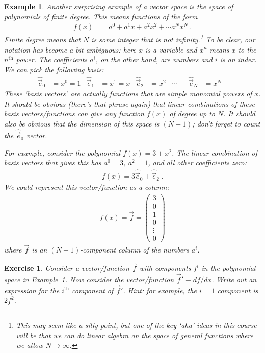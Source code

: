 \documentclass[12pt]{article}
\newtheorem{exercise}{Exercise}[section]
\newtheorem{example}{Example}[section]
\begin{document}
\begin{example}\label{eg:polynomial:space}
Another surprising example of a vector space is the space of polynomials of finite degree. This means functions of the form
\begin{align}
    f(x) &= a^0 + a^1 x + a^2x^2 + \cdots a^N x^N \ .
\end{align}
Finite degree means that $N$ is some integer that is not infinity.\footnote{This may seem like a silly point, but one of the key `aha' ideas in this course will be that we can do linear algebra on the space of general functions where we allow $N\to \infty$.}
To be clear, our notation has become a bit ambiguous: here $x$ is a variable and $x^n$ means $x$ to the $n^\text{th}$ power. The coefficients $a^i$, on the other hand, are numbers and $i$ is an index. We can pick the following basis:
\begin{align}
    \hat{\vec{e}}_0 &= x^0 = 1 &
    \hat{\vec{e}}_1 &= x^1 = x &
    \hat{\vec{e}}_2 &= x^2 &
    \cdots&&
    \hat{\vec{e}}_N &= x^N &
\end{align}
These `basis vectors' are actually functions that are simple monomial powers of $x$. It should be obvious (there's that phrase again) that linear combinations of these basis vectors/functions can give any function $f(x)$ of degree up to $N$. It should also be obvious that the dimension of this space is $(N+1)$; don't forget to count the $\hat{\vec{e}}_0$ vector.

For example, consider the polynomial $f(x) = 3+x^2$. The linear combination of basis vectors that gives this has $a^0 = 3$, $a^2 = 1$, and all other coefficients zero:
\begin{align}
    f(x) = 3\hat{\vec{e}}_0 + \hat{\vec{e}}_2 \ .
\end{align}
We could represent this vector/function as a column:
\begin{align}
    f(x) = \vec{f} = 
    \begin{pmatrix}
        3 \\
        0 \\
        1 \\
        0 \\
        \vdots  \\
        0
    \end{pmatrix}
\end{align}
where $\vec{f}$ is an $(N+1)$-component column of the numbers $a^i$.
\end{example}

\begin{exercise}
Consider a vector/function $\vec{f}$ with components $f^i$ in the polynomial space in Example~\ref{eg:polynomial:space}. Now consider the vector/function $\vec{f}' \equiv df/dx$. Write out an expression for the $i^\text{th}$ component of $\vec{f}'$. \emph{Hint}: for example, the $i=1$ component is $2f^2$.
\end{exercise}
\end{document}
